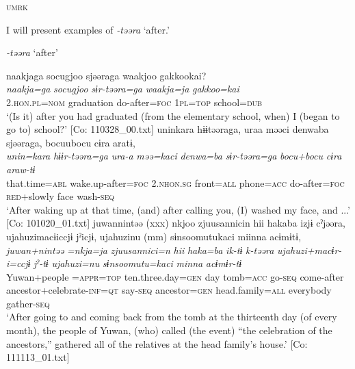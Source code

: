           \textsc{umrk}
\z

I will present examples of \textit{-təəra} ‘after.’

\ea\label{ex:8-100}
  \textit{-təəra} ‘after’

\ea [= (\ref{ex:6-117}d)]

{\TM}
\glll  naakjaga  {\textbar}socugjoo{\textbar}  sjəəraga  waakjoo  {\textbar}gakkoo{\textbar}kai?\\
\textit{naakja=ga}  \textit{socugjoo}  \textit{sɨr-təəra=ga}  \textit{waakja=ja}  \textit{gakkoo=kai}\\
2.\textsc{hon}.\textsc{pl}=\textsc{nom}  graduation  do-after=\textsc{foc}  1\textsc{pl}=\textsc{top}  school=\textsc{dub}\\
\glt ‘(Is it) after you had graduated (from the elementary school, when) I (began to go to) school?’ [Co: 110328\_00.txt]
\ex
{\TM}
\glll  uninkara  hɨɨtəəraga,  uraa  məəci  {\textbar}denwa{\textbar}ba   sjəəraga,  bocuubocu  cɨra  aratɨ,\\
\textit{unin=kara}  \textit{hɨɨr-təəra=ga}  \textit{ura-a}  \textit{məə=kaci}  \textit{denwa=ba}      \textit{sɨr-təəra=ga}  \textit{bocu+bocu}  \textit{cɨra}  \textit{araw-tɨ}\\
that.time=\textsc{abl}  wake.up-after=\textsc{foc}  2.\textsc{nhon}.\textsc{sg}  front=\textsc{all}  phone=\textsc{acc}  do-after=\textsc{foc}  \textsc{red}+slowly  face  wash-\textsc{seq}\\
\glt ‘After waking up at that time, (and) after calling you, (I) washed my face, and ...’ [Co: 101020\_01.txt]
\ex
{\TM}
\glll  juwannintəə  (xxx)  nkjoo  {\textbar}zjuusannici{\textbar}n  hii    hakaba  izjɨ  cˀjəəra,  ujahuzimacɨiccjɨ  jˀicjɨ,    ujahuzinu  (mm)  sɨnsoomutukaci  miinna  acɨmɨtɨ,\\
\textit{juwan+nintəə}    \textit{=nkja=ja}  \textit{zjuusannici=n}  \textit{hii}   \textit{haka=ba}  \textit{ik-tɨ}  \textit{k-təəra}  \textit{ujahuzi+macɨr-i=ccjɨ}  \textit{jˀ-tɨ}   \textit{ujahuzi=nu}    \textit{sɨnsoomutu=kaci}  \textit{minna}  \textit{acɨmɨr-tɨ}\\
Yuwan+people    =\textsc{appr}=\textsc{top}  ten.three.day=\textsc{gen}  day   tomb=\textsc{acc}  go-\textsc{seq}  come-after  ancestor+celebrate-\textsc{inf}=\textsc{qt}  say-\textsc{seq}    ancestor=\textsc{gen}    head.family=\textsc{all}  everybody  gather-\textsc{seq}\\
\glt ‘After going to and coming back from the tomb at the thirteenth day (of every month), the people of Yuwan, (who) called (the event) “the celebration of the ancestors,” gathered all of the relatives at the head family’s house.’ [Co: 111113\_01.txt]

